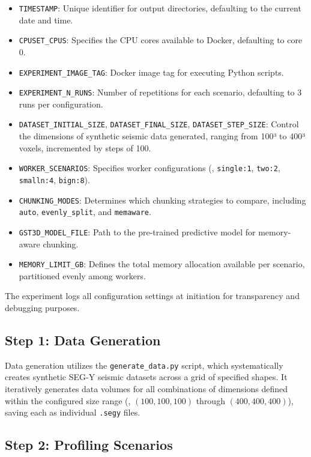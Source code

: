 \begin{itemize}
    \item \texttt{TIMESTAMP}: Unique identifier for output directories, defaulting to the current date and time.
    \item \texttt{CPUSET\_CPUS}: Specifies the CPU cores available to Docker, defaulting to core 0.
    \item \texttt{EXPERIMENT\_IMAGE\_TAG}: Docker image tag for executing Python scripts.
    \item \texttt{EXPERIMENT\_N\_RUNS}: Number of repetitions for each scenario, defaulting to 3 runs per configuration.
    \item \texttt{DATASET\_INITIAL\_SIZE}, \texttt{DATASET\_FINAL\_SIZE}, \texttt{DATASET\_STEP\_SIZE}: Control the dimensions of synthetic seismic data generated, ranging from 100³ to 400³ voxels, incremented by steps of 100.
    \item \texttt{WORKER\_SCENARIOS}: Specifies worker configurations (\eg, \texttt{single:1}, \texttt{two:2}, \texttt{smalln:4}, \texttt{bign:8}).
    \item \texttt{CHUNKING\_MODES}: Determines which chunking strategies to compare, including \texttt{auto}, \texttt{evenly\_split}, and \texttt{memaware}.
    \item \texttt{GST3D\_MODEL\_FILE}: Path to the pre-trained predictive model for memory-aware chunking.
    \item \texttt{MEMORY\_LIMIT\_GB}: Defines the total memory allocation available per scenario, partitioned evenly among workers.
\end{itemize}

The experiment logs all configuration settings at initiation for transparency and debugging purposes.

\subsection*{Step 1: Data Generation}

Data generation utilizes the \texttt{generate\_data.py} script, which systematically creates synthetic \ac{SEG-Y} seismic datasets across a grid of specified shapes.
It iteratively generates data volumes for all combinations of dimensions defined within the configured size range (\eg, $(100,100,100)$ through $(400,400,400)$), saving each as individual \texttt{.segy} files.

\subsection*{Step 2: Profiling Scenarios}

